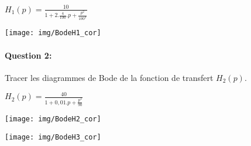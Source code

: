 \begin{center}
$H_1(p)=\frac{10}{1+2.\frac{4}{100}.p+\frac{p^2}{100^2}}$
\end{center}

\begin{center}
 \texttt{[image: img/BodeH1\_cor]}
\end{center}

\paragraph{Question 2:} Tracer les diagrammes de Bode de la fonction de transfert $H_2(p)$.

\begin{center}
$H_2(p)=\frac{40}{1+0,01.p+\frac{p^2}{90}}$
\end{center}

\begin{center}
 \texttt{[image: img/BodeH2\_cor]}
\end{center}

\begin{center}
 \texttt{[image: img/BodeH3\_cor]}
\end{center}


